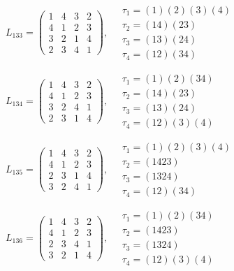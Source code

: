 $L_{133} = \begin{pmatrix} 1 & 4 & 3 & 2 \\ 4 & 1 & 2 & 3 \\ 3 & 2 & 1 & 4 \\ 2 & 3 & 4 & 1 \end{pmatrix}, \quad \begin{matrix} \tau_{1} = (1)(2)(3)(4) \\ \tau_{2} = (1 4)(2 3) \\ \tau_{3} = (1 3)(2 4) \\ \tau_{4} = (1 2)(3 4) \end{matrix}$

$L_{134} = \begin{pmatrix} 1 & 4 & 3 & 2 \\ 4 & 1 & 2 & 3 \\ 3 & 2 & 4 & 1 \\ 2 & 3 & 1 & 4 \end{pmatrix}, \quad \begin{matrix} \tau_{1} = (1)(2)(3 4) \\ \tau_{2} = (1 4)(2 3) \\ \tau_{3} = (1 3)(2 4) \\ \tau_{4} = (1 2)(3)(4) \end{matrix}$

$L_{135} = \begin{pmatrix} 1 & 4 & 3 & 2 \\ 4 & 1 & 2 & 3 \\ 2 & 3 & 1 & 4 \\ 3 & 2 & 4 & 1 \end{pmatrix}, \quad \begin{matrix} \tau_{1} = (1)(2)(3)(4) \\ \tau_{2} = (1 4 2 3) \\ \tau_{3} = (1 3 2 4) \\ \tau_{4} = (1 2)(3 4) \end{matrix}$

$L_{136} = \begin{pmatrix} 1 & 4 & 3 & 2 \\ 4 & 1 & 2 & 3 \\ 2 & 3 & 4 & 1 \\ 3 & 2 & 1 & 4 \end{pmatrix}, \quad \begin{matrix} \tau_{1} = (1)(2)(3 4) \\ \tau_{2} = (1 4 2 3) \\ \tau_{3} = (1 3 2 4) \\ \tau_{4} = (1 2)(3)(4) \end{matrix}$

